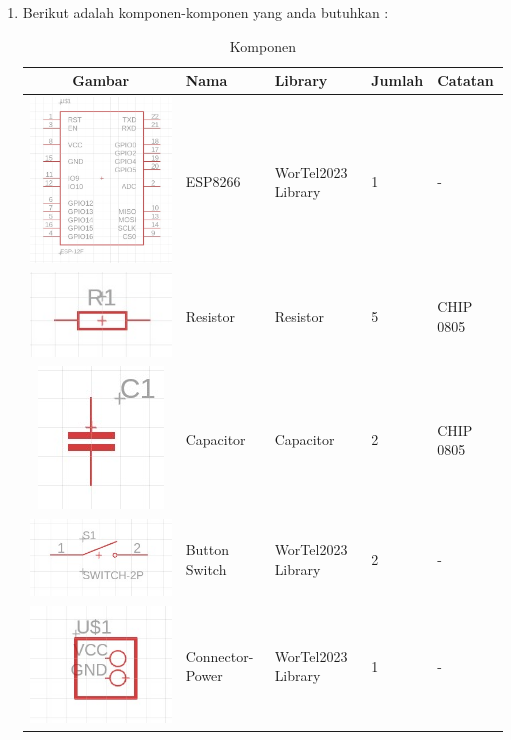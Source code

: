 \begin{enumerate}
\begin{figure}[H]
            
            \label{fig:Status Library}
        \end{figure}
    \item Berikut adalah komponen-komponen yang anda butuhkan :
    \vspace{5pt}
    \begin{table}[ht]
        
   
    \begin{center}
    
        \caption{Komponen}
        \label{tab:komponen}

        \begin{tabular}{|c|p{2cm}|m{2cm}|m{2cm}|m{2cm}|}
            \hline
            Gambar & Nama & Library & Jumlah & Catatan \\
            \hline
            \includegraphics[width=0.1\linewidth]{P1/img/komponen_esp.jpg} &  {\fontsize{10}{6}\selectfont ESP8266} &  {\fontsize{9}{6}\selectfont WorTel2023 Library} & 1 & - \\
            \hline
            \includegraphics[width=0.1\linewidth]{P1/img/komponen_resistor.jpg} & {\fontsize{10}{6}\selectfont Resistor} & {\fontsize{8}{6}\selectfont Resistor} & 5 &  {\fontsize{8}{6}\selectfont CHIP 0805} \\
            \hline
            \includegraphics[width=0.1\linewidth]{P1/img/komponen_capacitor.jpg} & {\fontsize{10}{6}\selectfont Capacitor} & {\fontsize{8}{6}\selectfont Capacitor} & 2 &  {\fontsize{8}{6}\selectfont CHIP 0805} \\
            \hline
            \includegraphics[width=0.1\linewidth]{P1/img/komponen_button_switch.jpg} & {\fontsize{8}{6}\selectfont Button Switch} &  {\fontsize{9}{6}\selectfont WorTel2023 Library} & 2 & - \\
            \hline
            \includegraphics[width=0.1\linewidth]{P1/img/komponen_supply_connector.jpg} & {\fontsize{8}{6}\selectfont Connector-Power} &  {\fontsize{9}{6}\selectfont WorTel2023 Library} & 1 & - \\

\end{tabular}
\end{center}
\end{table}
\end{enumerate}
